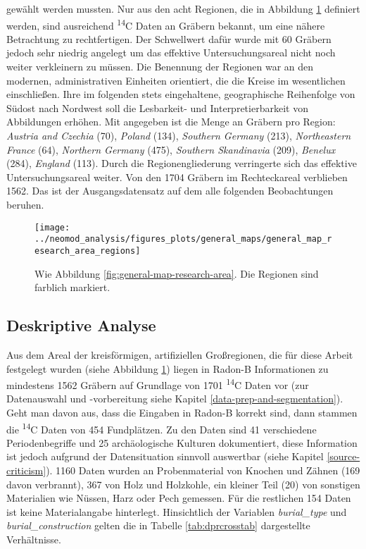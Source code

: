 \documentclass[openany,twoside,twocolumn]{book}
\begin{document}
gewählt werden mussten. Nur aus den acht Regionen, die in Abbildung
\ref{fig:general-map-research-area-regions} definiert werden, sind
ausreichend \textsuperscript{14}C Daten an Gräbern bekannt, um eine
nähere Betrachtung zu rechtfertigen. Der Schwellwert dafür wurde mit 60
Gräbern jedoch sehr niedrig angelegt um das effektive Untersuchungsareal
nicht noch weiter verkleinern zu müssen. Die Benennung der Regionen war
an den modernen, administrativen Einheiten orientiert, die die Kreise im
wesentlichen einschließen. Ihre im folgenden stets eingehaltene,
geographische Reihenfolge von Südost nach Nordwest soll die Lesbarkeit-
und Interpretierbarkeit von Abbildungen erhöhen. Mit angegeben ist die
Menge an Gräbern pro Region: \emph{Austria and Czechia} (70),
\emph{Poland} (134), \emph{Southern Germany} (213), \emph{Northeastern
France} (64), \emph{Northern Germany} (475), \emph{Southern Skandinavia}
(209), \emph{Benelux} (284), \emph{England} (113). Durch die
Regionengliederung verringerte sich das effektive Untersuchungsareal
weiter. Von den 1704 Gräbern im Rechteckareal verblieben 1562. Das ist
der Ausgangsdatensatz auf dem alle folgenden Beobachtungen beruhen.

\begin{figure}
\texttt{[image: ../neomod\_analysis/figures\_plots/general\_maps/general\_map\_research\_area\_regions]} \caption[Karte mit \textsuperscript{14}C Daten, dem Untersuchungsareal und den künstlichen Regionen]{Wie Abbildung \ref{fig:general-map-research-area}. Die Regionen sind farblich markiert.}\label{fig:general-map-research-area-regions}
\end{figure}

\hypertarget{deskriptive-analyse}{%
\subsection{Deskriptive Analyse}\label{deskriptive-analyse}}

Aus dem Areal der kreisförmigen, artifiziellen Großregionen, die für
diese Arbeit festgelegt wurden (siehe Abbildung
\ref{fig:general-map-research-area-regions}) liegen in Radon-B
Informationen zu mindestens 1562 Gräbern auf Grundlage von 1701
\textsuperscript{14}C Daten vor (zur Datenauswahl und -vorbereitung
siehe Kapitel \ref{data-prep-and-segmentation}). Geht man davon aus,
dass die Eingaben in Radon-B korrekt sind, dann stammen die
\textsuperscript{14}C Daten von 454 Fundplätzen. Zu den Daten sind 41
verschiedene Periodenbegriffe und 25 archäologische Kulturen
dokumentiert, diese Information ist jedoch aufgrund der Datensituation
sinnvoll auswertbar (siehe Kapitel \ref{source-criticism}). 1160 Daten
wurden an Probenmaterial von Knochen und Zähnen (169 davon verbrannt),
367 von Holz und Holzkohle, ein kleiner Teil (20) von sonstigen
Materialien wie Nüssen, Harz oder Pech gemessen. Für die restlichen 154
Daten ist keine Materialangabe hinterlegt. Hinsichtlich der Variablen
\emph{burial\_type} und \emph{burial\_construction} gelten die in
Tabelle \ref{tab:dprcrosstab} dargestellte Verhältnisse.
\end{document}
